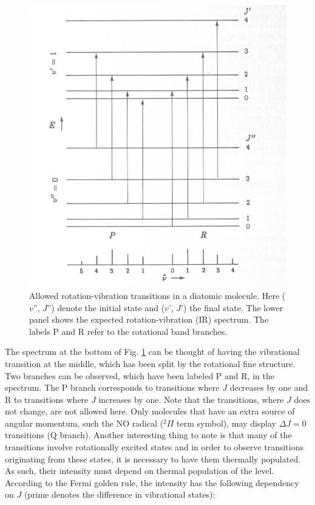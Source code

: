 \documentclass[byrevtex,amssymb,aps,pra,floatfix,letterpaper]{revtex4}
\begin{document}
\begin{figure}[!htp]
\begin{center}
\includegraphics[scale=0.4]{fig2}
\caption{Allowed rotation-vibration transitions in a diatomic molecule. Here ($v$'', $J$'') denote the initial state and ($v$', $J$') the final state. The lower panel shows the expected rotation-vibration (IR) spectrum. The labels P and R refer to the rotational band branches.}
\label{fig2}
\end{center}
\end{figure}

The spectrum at the bottom of Fig. \ref{fig2} can be thought of having the vibrational transition at the middle, which has been split by the rotational fine structure. Two branches can be observed, which have been labeled P and R, in the spectrum. The P branch corresponds to transitions where $J$ decreases by one and R to transitions where $J$ increases by one. Note that the transitions, where $J$ does not change, are not allowed here. Only molecules that have an extra source of angular momentum, such the NO radical ($^2\Pi$ term symbol), may display $\Delta J = 0$ transitions (Q branch). Another interesting thing to note is that many
of the transitions involve rotationally excited states and in order to observe transitions originating from these states, it is necessary to have them thermally populated. As such, their intensity must depend on thermal population of the level. According to the Fermi golden rule, the intensity has the following dependency on $J$ (prime denotes the difference in vibrational states):
\end{document}
